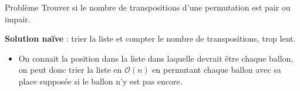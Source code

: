 \begin{frame}
    \frametitle{\problemtitle}
        \begin{block}
            {Problème} Trouver si le nombre de transpositions d'une permutation est pair ou impair.
        \end{block}
        \pause
        \textbf{Solution naïve} : trier la liste et compter le nombre de transpositions, trop lent.
        \pause
        \begin{itemize}
            \item<+-> On connait la position dans la liste dans laquelle devrait être chaque ballon, on peut donc trier la liste en $\mathcal{O}(n)$ en permutant chaque ballon avec sa place supposée si le ballon n'y est pas encore.
    \end{itemize}
    \solvestats
\end{frame}
